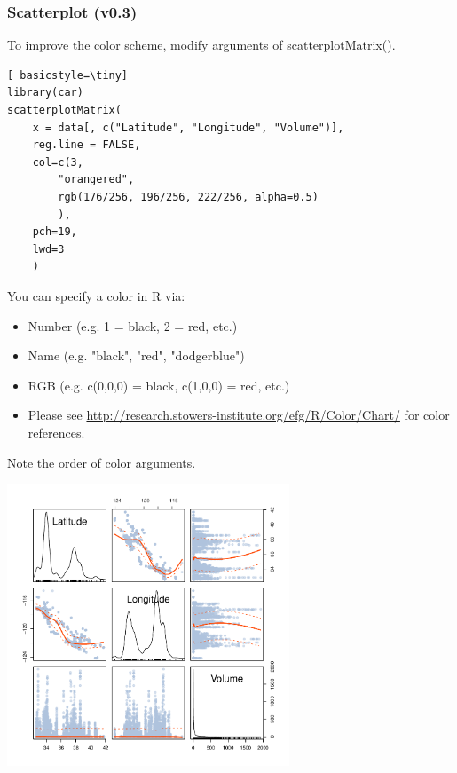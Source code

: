 \begin{frame}
\frametitle{Scatterplot (v0.3)}

To improve the color scheme, modify arguments of \ttfamily scatterplotMatrix().  
  		\begin{lstlisting}[ basicstyle=\tiny]
library(car)		
scatterplotMatrix(
	x = data[, c("Latitude", "Longitude", "Volume")], 
	reg.line = FALSE,
	col=c(3,
		"orangered",
		rgb(176/256, 196/256, 222/256, alpha=0.5)
		), 
	pch=19,
	lwd=3
	)
		\end{lstlisting}
\normalfont
\framebreak
You can specify a color in R via: 
\begin{itemize}
	\item Number (e.g. 1 = black, 2 = red, etc.)
	\item Name (e.g. "black", "red", "dodgerblue")
	\item RGB (e.g. c(0,0,0) = black, c(1,0,0) = red, etc.)
	\item Please see \url{http://research.stowers-institute.org/efg/R/Color/Chart/} for color references. 
\end{itemize}

\noindent Note the order of color arguments. \normalfont
        \begin{center}
         \includegraphics[width=0.63\textwidth]{images/scatterPlot_v3.pdf}
        \end{center}
\end{frame}



